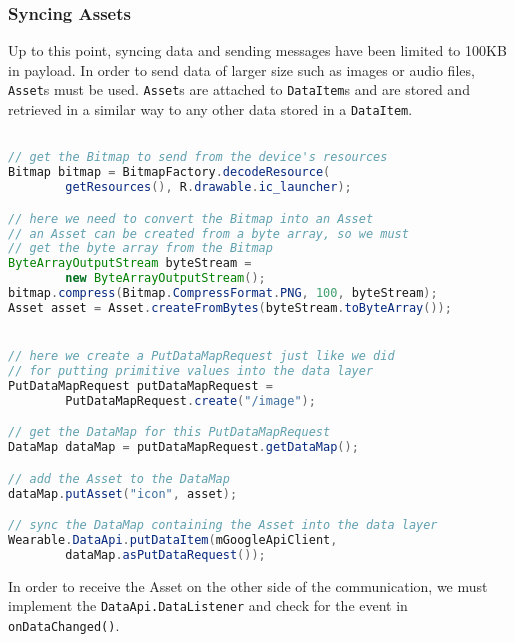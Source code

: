 
\subsubsection{Syncing Assets}
Up to this point, syncing data and sending messages have been limited to 100KB
in payload. In order to send data of larger size such as images or audio files,
\texttt{Asset}s must be used. \texttt{Asset}s are attached to
\texttt{DataItem}s and are stored and retrieved in a similar way to any other
data stored in a \texttt{DataItem}.

\begin{lstlisting}[language=Java]

// get the Bitmap to send from the device's resources
Bitmap bitmap = BitmapFactory.decodeResource(
        getResources(), R.drawable.ic_launcher);

// here we need to convert the Bitmap into an Asset
// an Asset can be created from a byte array, so we must
// get the byte array from the Bitmap
ByteArrayOutputStream byteStream =
        new ByteArrayOutputStream();
bitmap.compress(Bitmap.CompressFormat.PNG, 100, byteStream);
Asset asset = Asset.createFromBytes(byteStream.toByteArray());


// here we create a PutDataMapRequest just like we did
// for putting primitive values into the data layer
PutDataMapRequest putDataMapRequest =
        PutDataMapRequest.create("/image");

// get the DataMap for this PutDataMapRequest
DataMap dataMap = putDataMapRequest.getDataMap();

// add the Asset to the DataMap
dataMap.putAsset("icon", asset);

// sync the DataMap containing the Asset into the data layer
Wearable.DataApi.putDataItem(mGoogleApiClient,
        dataMap.asPutDataRequest());

\end{lstlisting}

In order to receive the Asset on the other side of the communication, we must
implement the \texttt{DataApi.DataListener} and check for the event in
\texttt{onDataChanged()}.

